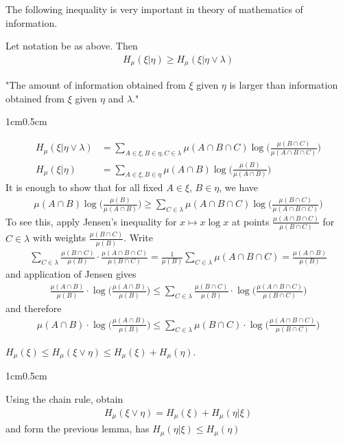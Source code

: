 \documentclass[12pt,a4paper]{report}
\newenvironment{proof}
{\begin{changemargin}{1cm}{0.5cm} 
	}%
	{\end{changemargin}
}
\begin{document}
The following inequality is very important in theory of mathematics of information.
\s

\lem Let notation be as above. Then
\begin{align*}
H_{\mu}(\xi | \eta) \geq H_{\mu}(\xi | \eta \vee \lambda)
\end{align*}

"The amount of information obtained from $\xi$ given $\eta$ is larger than information obtained from $\xi$ given $\eta$ and $\lambda$."
\begin{proof}
\pf 
\begin{align*}
H_{\mu}(\xi | \eta \vee \lambda) &= \sum_{A \in \xi, B \in \eta, C \in \lambda} \mu(A\cap B \cap C) \log \Big( \frac{\mu(B\cap C)}{\mu(A\cap B \cap C)}\Big) \\
H_{\mu}(\xi | \eta ) &= \sum_{A \in \xi, B \in \eta} \mu(A\cap B ) \log \Big( \frac{\mu(B)}{\mu(A\cap B )}\Big)
\end{align*}
It is enough to show that for all fixed $A \in \xi$, $B\in \eta$, we have
\begin{align*}
\mu(A\cap B) \log \Big( \frac{\mu(B)}{\mu(A\cap B)}\Big) \geq \sum_{C \in \lambda} \mu(A \cap B \cap C) \log \Big( \frac{\mu(B\cap C)}{\mu(A\cap B \cap C)} \Big)
\end{align*}
To see this, apply Jensen's inequality for $x\mapsto x\log x$ at points $\frac{\mu(A\cap B\cap C)}{\mu(B \cap C)}$ for $C \in \lambda$ with weights $\frac{\mu(B\cap C)}{\mu(B)}$. Write
\begin{align*}
\sum_{C\in \lambda } \frac{\mu(B\cap C)}{\mu(B)} \cdot \frac{\mu(A\cap B \cap C)}{\mu(B\cap C)} = \frac{1}{\mu(B)} \sum_{C\in \lambda} \mu(A\cap B \cap C) = \frac{\mu(A\cap B)}{\mu(B)}
\end{align*}
and application of Jensen gives
\begin{align*}
\frac{\mu(A\cap B)}{\mu(B)}\cdot \log \Big( \frac{\mu(A\cap B)}{\mu(B)} \Big) \leq \sum_{C\in \lambda} \frac{\mu(B\cap C)}{\mu(B)} \cdot \log\Big( \frac{\mu(A\cap B \cap C)}{\mu(B\cap C)} \Big)
\end{align*}
and therefore
\begin{align*}
\mu(A\cap B)\cdot \log \Big( \frac{\mu(A\cap B)}{\mu(B)} \Big) \leq \sum_{C\in \lambda} \mu(B\cap C) \cdot \log \Big( \frac{\mu(A\cap B \cap C)}{\mu(B\cap C)} \Big)
\end{align*}

\eop
\end{proof}
\s

\cor $H_{\mu}(\xi) \leq H_{\mu}(\xi \vee \eta) \leq H_{\mu}(\xi) + H_{\mu}(\eta)$.
\begin{proof}
\pf Using the chain rule, obtain
\begin{align*}
H_{\mu}(\xi \vee \eta) = H_{\mu} (\xi)  + H_{\mu}(\eta | \xi)
\end{align*}
and form the previous lemma, has $H_{\mu}(\eta |\xi) \leq H_{\mu}(\eta)$

\eop
\end{proof}
\s
\end{document}
